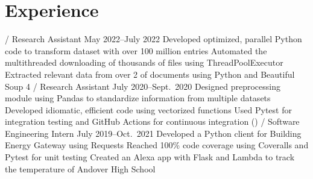\section{Experience}
\begin{outline}
     / Research Assistant
    \hfill May 2022--July 2022
        \1 Developed optimized, parallel Python code to transform dataset with over 100 million entries
        \1 Automated the multithreaded downloading of thousands of files using ThreadPoolExecutor
        \1 Extracted relevant data from over 2  of   documents using Python and Beautiful Soup 4
     / Research Assistant
    \hfill July 2020--Sept.\ 2020
        \1 Designed preprocessing module using Pandas to standardize information from multiple datasets
            \2 Developed idiomatic, efficient code using vectorized functions
            \2 Used Pytest for integration testing and GitHub Actions for continuous integration ()
     / Software Engineering Intern
    \hfill July 2019--Oct.\ 2021
        \1 Developed a Python client for Building Energy Gateway using Requests
            \2 Reached 100\% code coverage using Coveralls and Pytest for unit testing
        \1 Created an Alexa app with Flask and  Lambda to track the temperature of Andover High School
\end{outline}

